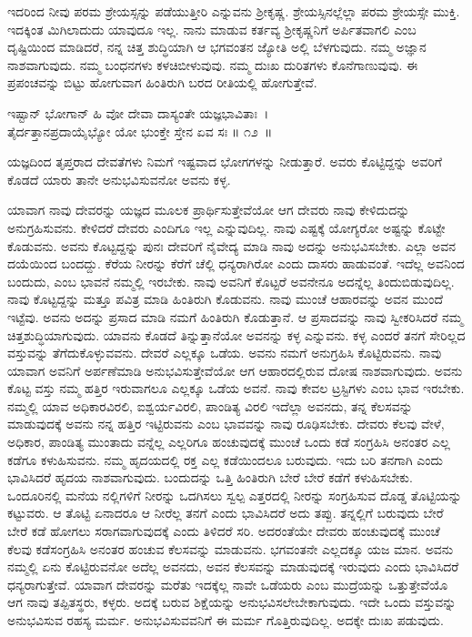 ಇದರಿಂದ ನೀವು ಪರಮ ಶ್ರೇಯಸ್ಸನ್ನು ಪಡೆಯುತ್ತೀರಿ ಎನ್ನುವನು ಶ‍್ರೀಕೃಷ್ಣ. ಶ್ರೇಯಸ್ಸಿ\-ನಲ್ಲೆಲ್ಲಾ ಪರಮ ಶ್ರೇಯಸ್ಸೇ ಮುಕ್ತಿ. ಇದಕ್ಕಿಂತ ಮಿಗಿಲಾದುದು ಯಾವುದೂ ಇಲ್ಲ. ನಾನು ಮಾಡುವ ಕರ್ತವ್ಯ ಶ‍್ರೀಕೃಷ್ಣನಿಗೆ ಅರ್ಪಿತವಾಗಲಿ ಎಂಬ ದೃಷ್ಟಿಯಿಂದ ಮಾಡಿದರೆ, ನನ್ನ ಚಿತ್ತ ಶುದ್ಧಿಯಾಗಿ ಆ ಭಗವಂತನ ಜ್ಯೋತಿ ಅಲ್ಲಿ ಬೆಳಗುವುದು. ನಮ್ಮ ಅಜ್ಞಾನ ನಾಶವಾಗುವುದು. ನಮ್ಮ ಬಂಧನಗಳು ಕಳಚಿಬೀಳುವುವು. ನಮ್ಮ ದುಃಖ ದುರಿತಗಳು ಕೊನೆಗಾಣುವುವು. ಈ ಪ್ರಪಂಚವನ್ನು ಬಿಟ್ಟು ಹೋಗುವಾಗ ಹಿಂತಿರುಗಿ ಬರದ ರೀತಿಯಲ್ಲಿ ಹೋಗುತ್ತೇವೆ.

\begin{shloka}
ಇಷ್ಟಾನ್ ಭೋಗಾನ್ ಹಿ ವೋ ದೇವಾ ದಾಸ್ಯಂತೇ ಯಜ್ಞಭಾವಿತಾಃ~।\\ತೈರ್ದತ್ತಾನಪ್ರದಾಯೈಭ್ಯೋ ಯೋ ಭುಂಕ್ತೇ ಸ್ತೇನ ಏವ ಸಃ \hfill॥ ೧೨~॥
\end{shloka}

\begin{artha}
ಯಜ್ಞದಿಂದ ತೃಪ್ತರಾದ ದೇವತೆಗಳು ನಿಮಗೆ ಇಷ್ಟವಾದ ಭೋಗಗಳನ್ನು ನೀಡುತ್ತಾರೆ. ಅವರು ಕೊಟ್ಟಿದ್ದನ್ನು ಅವರಿಗೆ ಕೊಡದೆ ಯಾರು ತಾನೇ ಅನುಭವಿಸುವನೋ ಅವನು ಕಳ್ಳ.
\end{artha}

ಯಾವಾಗ ನಾವು ದೇವರನ್ನು ಯಜ್ಞದ ಮೂಲಕ ಪ್ರಾರ್ಥಿಸುತ್ತೇವೆಯೋ ಆಗ ದೇವರು ನಾವು ಕೇಳಿದುದನ್ನು ಅನುಗ್ರಹಿಸುವನು. ಕೇಳಿದರೆ ದೇವರು ಎಂದಿಗೂ ಇಲ್ಲ ಎನ್ನುವುದಿಲ್ಲ. ನಾವು ಎಷ್ಟಕ್ಕೆ ಯೋಗ್ಯರೋ ಅಷ್ಟನ್ನು ಕೊಟ್ಟೇ ಕೊಡುವನು. ಅವನು ಕೊಟ್ಟದ್ದನ್ನು ಪುನಃ ದೇವರಿಗೆ ನೈವೇದ್ಯ ಮಾಡಿ ನಾವು ಅದನ್ನು ಅನುಭವಿಸಬೇಕು. ಎಲ್ಲಾ ಅವನ ದಯೆಯಿಂದ ಬಂದದ್ದು. ಕೆರೆಯ ನೀರನ್ನು ಕೆರೆಗೆ ಚೆಲ್ಲಿ ಧನ್ಯರಾಗಿರೋ ಎಂದು ದಾಸರು ಹಾಡುವಂತೆ. ಇದೆಲ್ಲ ಅವನಿಂದ ಬಂದುದು, ಎಂಬ ಭಾವನೆ ನಮ್ಮಲ್ಲಿ ಇರಬೇಕು. ನಾವು ಅವನಿಗೆ ಕೊಟ್ಟರೆ ಅವನೇನೂ ಅದನ್ನೆಲ್ಲ ತಿಂದುಬಿಡುವುದಿಲ್ಲ. ನಾವು ಕೊಟ್ಟದ್ದನ್ನು ಮತ್ತೂ ಪವಿತ್ರ ಮಾಡಿ ಹಿಂತಿರುಗಿ ಕೊಡುವನು. ನಾವು ಮುಂಚೆ ಆಹಾರವನ್ನು ಅವನ ಮುಂದೆ ಇಟ್ಟೆವು. ಅವನು ಅದನ್ನು ಪ್ರಸಾದ ಮಾಡಿ ನಮಗೆ ಹಿಂತಿರುಗಿ ಕೊಡುತ್ತಾನೆ. ಆ ಪ್ರಸಾದವನ್ನು ನಾವು ಸ್ವೀಕರಿಸಿದರೆ ನಮ್ಮ ಚಿತ್ತಶುದ್ಧಿಯಾಗುವುದು. ಯಾವನು ಕೊಡದೆ ತಿನ್ನುತ್ತಾನೆಯೋ ಅವನನ್ನು ಕಳ್ಳ ಎನ್ನುವನು. ಕಳ್ಳ ಎಂದರೆ ತನಗೆ ಸೇರಿಲ್ಲದ ವಸ್ತುವನ್ನು ತೆಗೆದುಕೊಳ್ಳುವವನು. ದೇವರೆ ಎಲ್ಲಕ್ಕೂ ಒಡೆಯ. ಅವನು ನಮಗೆ ಅನುಗ್ರಹಿಸಿ ಕೊಟ್ಟಿರುವನು. ನಾವು ಯಾವಾಗ ಅವನಿಗೆ ಅರ್ಪಣೆಮಾಡಿ ಅನುಭವಿಸುತ್ತೇವೆಯೋ ಆಗ ಆಹಾರದಲ್ಲಿರುವ ದೋಷ ನಾಶವಾಗುವುದು. ಅವನು ಕೊಟ್ಟ ವಸ್ತು ನಮ್ಮ ಹತ್ತಿರ ಇರುವಾಗಲೂ ಎಲ್ಲಕ್ಕೂ ಒಡೆಯ ಅವನೆ. ನಾವು ಕೇವಲ ಟ್ರಸ್ಟಿಗಳು ಎಂಬ ಭಾವ ಇರಬೇಕು. ನಮ್ಮಲ್ಲಿ ಯಾವ ಅಧಿಕಾರವಿರಲಿ, ಐಶ್ವರ್ಯವಿರಲಿ, ಪಾಂಡಿತ್ಯ ವಿರಲಿ ಇದೆಲ್ಲಾ ಅವನದು, ತನ್ನ ಕೆಲಸವನ್ನು ಮಾಡುವುದಕ್ಕೆ ಅವನು ನನ್ನ ಹತ್ತಿರ ಇಟ್ಟಿರುವನು ಎಂಬ ಭಾವವನ್ನು ನಾವು ರೂಢಿಸಬೇಕು. ದೇವರು ಕೆಲವು ವೇಳೆ, ಅಧಿಕಾರ, ಪಾಂಡಿತ್ಯ ಮುಂತಾದು ವನ್ನೆಲ್ಲ ಎಲ್ಲರಿಗೂ ಹಂಚುವುದಕ್ಕೆ ಮುಂಚೆ ಒಂದು ಕಡೆ ಸಂಗ್ರಹಿಸಿ ಅನಂತರ ಎಲ್ಲ ಕಡೆಗೂ ಕಳುಹಿಸುವನು. ನಮ್ಮ ಹೃದಯದಲ್ಲಿ ರಕ್ತ ಎಲ್ಲ ಕಡೆಯಿಂದಲೂ ಬರುವುದು. ಇದು ಬರಿ ತನಗಾಗಿ ಎಂದು ಭಾವಿಸಿದರೆ ಹೃದಯ ನಾಶವಾಗುವುದು. ಬಂದುದನ್ನು ಒತ್ತಿ ಹಿಂತಿರುಗಿ ಬೇರೆ ಬೇರೆ ಕಡೆಗೆ ಕಳುಹಿಸಬೇಕು. ಒಂದೂರಿನಲ್ಲಿ ಮನೆಯ ನಲ್ಲಿಗಳಿಗೆ ನೀರನ್ನು ಒದಗಿಸಲು ಸ್ವಲ್ಪ ಎತ್ತರದಲ್ಲಿ ನೀರನ್ನು ಸಂಗ್ರಹಿಸುವ ದೊಡ್ಡ ತೊಟ್ಟಿಯನ್ನು ಕಟ್ಟುವರು. ಆ ತೊಟ್ಟಿ ಏನಾದರೂ ಆ ನೀರೆಲ್ಲ ತನಗೆ ಎಂದು ಭಾವಿಸಿದರೆ ಅದು ತಪ್ಪು. ತನ್ನಲ್ಲಿಗೆ ಬರುವುದು ಬೇರೆ ಬೇರೆ ಕಡೆ ಹೋಗಲು ಸರಾಗವಾಗುವುದಕ್ಕೆ ಎಂದು ತಿಳಿದರೆ ಸರಿ. ಅದರಂತೆಯೇ ದೇವರು ಹಂಚುವುದಕ್ಕೆ ಮುಂಚೆ ಕೆಲವು ಕಡೆಸಂಗ್ರಹಿಸಿ ಅನಂತರ ಹಂಚುವ ಕೆಲಸವನ್ನು ಮಾಡುವನು. ಭಗವಂತನೇ ಎಲ್ಲದಕ್ಕೂ ಯಜ ಮಾನ. ಅವನು ನಮ್ಮಲ್ಲಿ ಏನು ಕೊಟ್ಟಿರುವನೋ ಅದೆಲ್ಲ ಅವನದು, ಅವನ ಕೆಲಸವನ್ನು ಮಾಡುವುದಕ್ಕೆ ಇರುವುದು ಎಂದು ಭಾವಿಸಿದರೆ ಧನ್ಯರಾಗುತ್ತೇವೆ. ಯಾವಾಗ ದೇವರನ್ನು ಮರೆತು ಇದಕ್ಕೆಲ್ಲ ನಾವೇ ಒಡೆಯರು ಎಂಬ ಮುದ್ರೆಯನ್ನು ಒತ್ತುತ್ತೇವೆಯೊ ಆಗ ನಾವು ತಪ್ಪಿತಸ್ಥರು, ಕಳ್ಳರು. ಅದಕ್ಕೆ ಬರುವ ಶಿಕ್ಷೆಯನ್ನು ಅನುಭವಿಸಲೇಬೇಕಾಗುವುದು. ಇದೇ ಒಂದು ವಸ್ತುವನ್ನು ಅನುಭವಿಸುವ ರಹಸ್ಯ ಮರ್ಮ. ಅನುಭವಿಸುವವನಿಗೆ ಈ ಮರ್ಮ ಗೊತ್ತಿರುವುದಿಲ್ಲ. ಅದಕ್ಕೇ ದುಃಖ ಪಡುವುದು.

